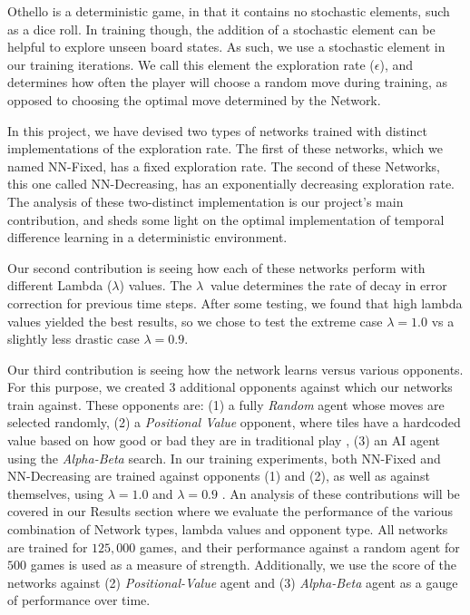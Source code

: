 \documentclass{sig-alternate-05-2015}
\begin{document}
Othello is a deterministic game, in that it contains no stochastic elements, such as a dice roll. In training though, the addition of a stochastic element can be helpful to explore unseen board states. As such, we use a stochastic element in our training iterations. We call this element the exploration rate (\(\epsilon\)), and determines how often the player will choose a random move during training, as opposed to choosing the optimal move determined by the Network.

In this project, we have devised two types of networks trained with distinct implementations of the exploration rate. The first of these networks, which we named NN-Fixed, has a fixed exploration rate. The second of these Networks, this one called NN-Decreasing, has an exponentially decreasing exploration rate. The analysis of these two-distinct implementation is our project's main contribution, and sheds some light on the optimal implementation of temporal difference learning in a deterministic environment.

Our second contribution is seeing how each of these networks perform with different Lambda (\(\lambda\)) values. The $\lambda\ $ value determines the rate of decay in error correction for previous time steps. After some testing, we found that high lambda values yielded the best results, so we chose to test the extreme case $\lambda  = 1.0$ vs a slightly less drastic case $\lambda  = 0.9$.

Our third contribution is seeing how the network learns versus various opponents. For this purpose, we created 3 additional opponents against which our networks train against. These opponents are: (1) a fully \emph{Random} agent whose moves are selected randomly, (2) a \emph{Positional Value} opponent, where tiles have a hardcoded value based on how good or bad they are in traditional play \cite{van2013reinforcement}, (3) an AI agent using the \emph{Alpha-Beta} search. In our training experiments, both NN-Fixed and NN-Decreasing are trained against opponents (1) and (2), as well as  against themselves, using  $\lambda  = 1.0$ and $\lambda  = 0.9$ . An analysis of these contributions will be covered in our Results section where we evaluate the performance of the various combination of Network types, lambda values and opponent type. All networks are trained for $125,000$ games, and their performance against a random agent for $500$ games is used as a measure of strength. Additionally, we use the score of the networks against (2) \emph{Positional-Value} agent and (3) \emph{Alpha-Beta} agent as a gauge of performance over time. 
\end{document}
